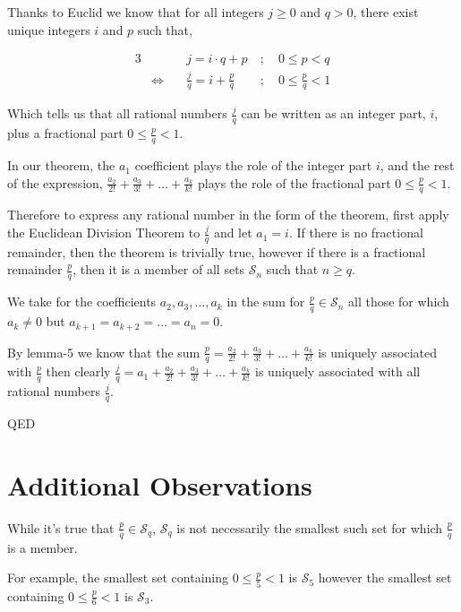 \documentclass{article}
\begin{document}
Thanks to Euclid we know that for all integers \(j\ge{}0\) and \(q>0\),
there exist unique integers \(i\) and \(p\) such that,

{\normalsize
\bgroup                                  %
\setlength{\abovedisplayskip}{0pt}       %
\begin{alignat*}{3}
&&j = i\cdot{}q + p\ &;\quad 0\le{}p<q \\
&\Leftrightarrow\quad &\frac{j}{q} = i + \frac{p}{q}\ &;\quad 0\le{}\frac{p}{q}<1
\end{alignat*}
\egroup
}

Which tells us that all rational numbers \(\frac{j}{q}\) can be written as
an integer part, \(i\), plus a fractional part \(0\le{}\frac{p}{q}<1\).

In our theorem, the \(a_1\) coefficient plays the role of the integer part \(i\),
and the rest of the expression, \(\frac{a_2}{2!} + \frac{a_3}{3!} + \dots{} + \frac{a_k}{k!}\)
plays the role of the fractional part \(0\le{}\frac{p}{q}<1\).

Therefore to express any rational number in the form of the theorem, first apply the
Euclidean Division Theorem to \(\frac{j}{q}\) and let \(a_1 = i\). If there is no fractional remainder, then
the theorem is trivially true,
however if there is a fractional remainder \(\frac{p}{q}\), then it is a member of all sets \(\mathcal{S}_n\)
such that \(n \ge{} q\).

We take for the coefficients \(a_2, a_3, \dots{}, a_k\) in the sum for \(\frac{p}{q} \in{} \mathcal{S}_n\)
all those for which \(a_k \ne{} 0\) but \(a_{k+1} = a_{k+2} = \dots{} = a_n = 0\).

By lemma-5 we know that the sum \(\frac{p}{q} = \frac{a_2}{2!} + \frac{a_3}{3!} + \dots{} + \frac{a_k}{k!}\) is
uniquely associated
with \(\frac{p}{q}\)
then clearly \(\frac{j}{q} = a_1 + \frac{a_2}{2!} + \frac{a_3}{3!} + \dots{} + \frac{a_k}{k!}\)
is uniquely associated with all rational numbers \(\frac{j}{q}\).

QED

\section*{Additional Observations}

While it's true that \(\frac{p}{q} \in{} \mathcal{S}_q\), \(\mathcal{S}_q\) is not necessarily 
the smallest such set for which \(\frac{p}{q}\) is a member.

For example,
the smallest set containing \(0 \le{} \frac{p}{5} < 1\) is \(\mathcal{S}_5\)
however
the smallest set containing \(0 \le{} \frac{p}{6} < 1\) is \(\mathcal{S}_3\).
\end{document}
